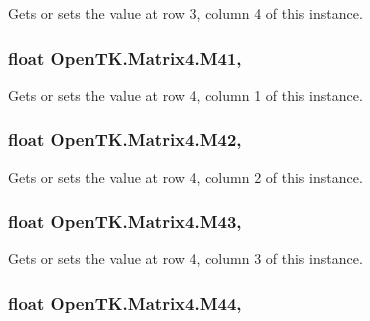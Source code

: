 Gets or sets the value at row 3, column 4 of this instance. 

\hypertarget{struct_open_t_k_1_1_matrix4_aa19e3083cee4c445d63a4b72f8b71011}{
\subsubsection[{M41}]{\setlength{\rightskip}{0pt plus 5cm}float Open\-T\-K.\-Matrix4.\-M41\hspace{0.3cm}{\ttfamily [get]}, {\ttfamily [set]}}}\label{struct_open_t_k_1_1_matrix4_aa19e3083cee4c445d63a4b72f8b71011}


Gets or sets the value at row 4, column 1 of this instance. 

\hypertarget{struct_open_t_k_1_1_matrix4_a2cf2cf88603879c9c92d43241b313959}{
\subsubsection[{M42}]{\setlength{\rightskip}{0pt plus 5cm}float Open\-T\-K.\-Matrix4.\-M42\hspace{0.3cm}{\ttfamily [get]}, {\ttfamily [set]}}}\label{struct_open_t_k_1_1_matrix4_a2cf2cf88603879c9c92d43241b313959}


Gets or sets the value at row 4, column 2 of this instance. 

\hypertarget{struct_open_t_k_1_1_matrix4_a3ffbf71f8cc86369e904314993f1ce12}{
\subsubsection[{M43}]{\setlength{\rightskip}{0pt plus 5cm}float Open\-T\-K.\-Matrix4.\-M43\hspace{0.3cm}{\ttfamily [get]}, {\ttfamily [set]}}}\label{struct_open_t_k_1_1_matrix4_a3ffbf71f8cc86369e904314993f1ce12}


Gets or sets the value at row 4, column 3 of this instance. 

\hypertarget{struct_open_t_k_1_1_matrix4_aa6fe6e3bada9edc1cae56372a92bf7ea}{
\subsubsection[{M44}]{\setlength{\rightskip}{0pt plus 5cm}float Open\-T\-K.\-Matrix4.\-M44\hspace{0.3cm}{\ttfamily [get]}, {\ttfamily [set]}}}\label{struct_open_t_k_1_1_matrix4_aa6fe6e3bada9edc1cae56372a92bf7ea}


